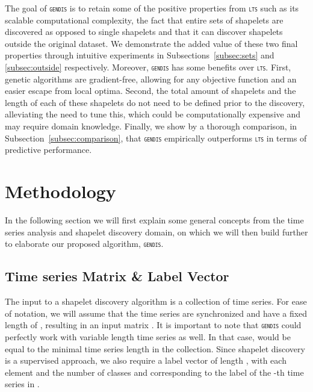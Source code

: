 \documentclass[runningheads]{llncs}
\begin{document}
The goal of \textsc{\texttt{gendis}} is to retain some of the positive properties from \textsc{\texttt{lts}} such as its scalable computational complexity, the fact that entire sets of shapelets are discovered as opposed to single shapelets and that it can discover shapelets outside the original dataset. We demonstrate the added value of these two final properties through intuitive experiments in Subsections~\ref{subsec:sets} and \ref{subsec:outside} respectively. Moreover, \textsc{\texttt{gendis}} has some benefits over \textsc{\texttt{lts}}. First, genetic algorithms are gradient-free, allowing for any objective function and an easier escape from local optima. Second, the total amount of shapelets and the length of each of these shapelets do not need to be defined prior to the discovery, alleviating the need to tune this, which could be computationally expensive and may require domain knowledge. Finally, we show by a thorough comparison, in Subsection~\ref{subsec:comparison}, that \textsc{\texttt{gendis}} empirically outperforms \textsc{\texttt{lts}} in terms of predictive performance.

\section{Methodology}\label{sec:methodology}

In the following section we will first explain some general concepts from the time series analysis and shapelet discovery domain, on which we will then build further to elaborate our proposed algorithm, \textsc{\texttt{gendis}}.

\subsection{Time series Matrix \& Label Vector}\label{subsec:method_data}
The input to a shapelet discovery algorithm is a collection of  time series. For ease of notation, we will assume that the time series are synchronized and have a fixed length of , resulting in an input matrix . It is important to note that \textsc{\texttt{gendis}} could perfectly work with variable length time series as well. In that case,  would be equal to the minimal time series length in the collection. Since shapelet discovery is a supervised approach, we also require a label vector  of length , with each element  and  the number of classes and  corresponding to the label of the -th time series in .
\end{document}
